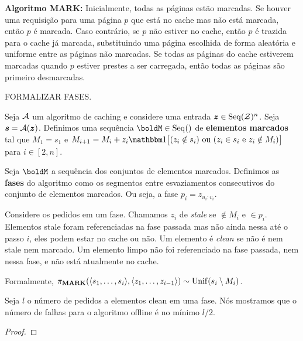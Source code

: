 \textbf{Algoritmo MARK:} Inicialmente, todas as páginas estão marcadas. Se houver uma requisição para uma página \(p\) que está no cache mas não está marcada, então \(p\) é marcada. Caso contrário, se \(p\) não estiver no cache, então \(p\) é trazida para o cache já marcada, substituindo uma página escolhida de forma aleatória e uniforme entre as páginas não marcadas. Se todas as páginas do cache estiverem marcadas quando \(p\) estiver prestes a ser carregada, então todas as páginas são primeiro desmarcadas.

FORMALIZAR FASES.

\begin{definition}
  Seja \(\mathcal{A}\) um algoritmo de caching e considere uma entrada \(\bm{z} \in \operatorname{Seq}(\mathcal{Z})^n\). Seja \(\bm{s} = \mathcal{A}(\bm{z})\). Definimos uma sequência \(\boldM \in \Seq()\) de \textbf{elementos marcados} tal que \(M_1 = s_1\) e \(M_{i+1} = M_i + z_i \ind{(z_i \notin s_i) \text{ ou } (z_i \in s_i \text{ e } z_i \notin M_i)}\) para \(i \in [2,n]\).
\end{definition}

\begin{definition}
  Seja \(\boldM\) a sequência dos conjuntos de elementos marcados. Definimos as \textbf{fases} do algoritmo como os segmentos entre esvaziamentos consecutivos do conjunto de elementos marcados. Ou seja, a fase \(p_i = z_{u_i:v_i} \).
\end{definition}

Considere os pedidos em um fase. Chamamos \(z_i\) de \emph{stale} se \(\notin M_i\) e \(\in p_i\). Elementos stale foram referenciadas na fase passada mas não ainda nessa até o passo \(i\), eles podem estar no cache ou não. Um elemento é \emph{clean} se não é nem stale nem marcado. Um elemento limpo não foi referenciado na fase passada, nem nessa fase, e não está atualmente no cache.

Formalmente, \( \pi_{\mathbf{MARK}}(\langle s_1, \dotsc, s_{i}\rangle, \langle z_1, \dotsc, z_{i-1}\rangle) \sim \mathrm{Unif}(s_i \setminus M_i) \).

\begin{lemma}
  \label{lem:clean_opt}
Seja \(l\) o número de pedidos a elementos clean em uma fase. Nós mostramos que o número de falhas para o algoritmo offline é no mínimo \(l/2\).
\begin{proof}
\end{proof}
\end{lemma}

